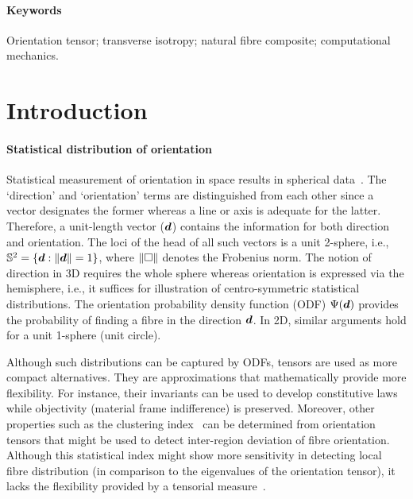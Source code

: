 \paragraph{Keywords} Orientation tensor; transverse isotropy; natural fibre composite; computational mechanics.

\section{Introduction}
	
	\paragraph{Statistical distribution of orientation} Statistical measurement of orientation in space results in spherical data~\autocite{Fisher.1987}. The `direction' and `orientation' terms are distinguished from each other since a vector designates the former whereas a line or axis is adequate for the latter. Therefore, a unit-length vector ($\tena{d}$) contains the information for both direction and orientation. The loci of the head of all such vectors is a unit 2-sphere, i.e., $\mathbb{S}^2 = \left\{\tena{d} : \lVert \tena{d}\rVert = 1 \right\}$, where $\lVert\square\rVert$ denotes the Frobenius norm. The notion of direction in 3D requires the whole sphere whereas orientation is expressed via the hemisphere, i.e., it suffices for illustration of centro-symmetric statistical distributions. The orientation probability density function (ODF) $\Psi(\tena{d})$ provides the probability of finding a fibre in the direction $\tena{d}$. In 2D, similar arguments hold for a unit 1-sphere (unit circle).
	 
	Although such distributions can be captured by ODFs, tensors are used as more compact alternatives. They are approximations that mathematically provide more flexibility. For instance, their invariants can be used to develop constitutive laws while objectivity (material frame indifference) is preserved. Moreover, other properties such as the clustering index~\autocite{Ranganathan.1990} can be determined from orientation tensors that might be used to detect inter-region deviation of fibre orientation. Although this statistical index might show more sensitivity in detecting local fibre distribution (in comparison to the eigenvalues of the orientation tensor), it lacks the flexibility provided by a tensorial measure~\autocite{Javanbakht.2019}.

